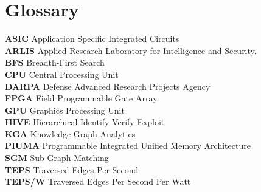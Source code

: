 \section{Glossary}
\small{
\textbf{ASIC} Application Specific Integrated Circuits \\
\textbf{ARLIS} Applied Research Laboratory for Intelligence and Security.\\ 
\textbf{BFS} Breadth-First Search \\
\textbf{CPU} Central Processing Unit \\
\textbf{DARPA} Defense Advanced Research Projects Agency \\ 
\textbf{FPGA} Field Programmable Gate Array \\
\textbf{GPU} Graphics Processing Unit \\
\textbf{HIVE} Hierarchical Identify Verify Exploit \\
\textbf{KGA} Knowledge Graph Analytics \\
\textbf{PIUMA} Programmable Integrated Unified Memory Architecture \\ 
\textbf{SGM} Sub Graph Matching \\
\textbf{TEPS} Traversed Edges Per Second \\
\textbf{TEPS/W} Traversed Edges Per Second Per Watt
}